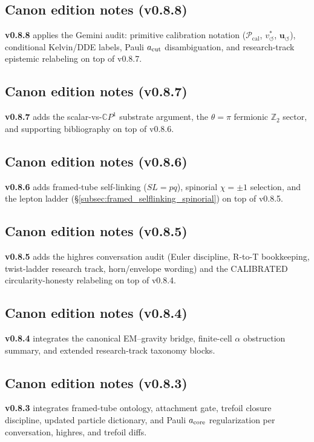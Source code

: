 \documentclass[11pt]{article}
\theoremstyle{definition}
\theoremstyle{plain}
\theoremstyle{remark}
\newcommand{\vchar}{v_{\!\boldsymbol{\circlearrowleft}}^{\ast}}
\newcommand{\uswirl}{\mathbf{u}_{\!\boldsymbol{\circlearrowleft}}}
\begin{document}
        \subsection{Canon edition notes (v0.8.8)}
            \textbf{v0.8.8} applies the Gemini audit: primitive calibration notation ($\mathcal{P}_{\mathrm{cal}}$, $\vchar$, $\uswirl$), conditional Kelvin/DDE labels, Pauli $a_{\rm cut}$ disambiguation, and research-track epistemic relabeling on top of v0.8.7.

        \subsection{Canon edition notes (v0.8.7)}
            \textbf{v0.8.7} adds the scalar-vs-$\mathbb{C}P^1$ substrate argument, the $\theta=\pi$ fermionic $\mathbb{Z}_2$ sector, and supporting bibliography on top of v0.8.6.

        \subsection{Canon edition notes (v0.8.6)}
            \textbf{v0.8.6} adds framed-tube self-linking ($SL=pq$), spinorial $\chi=\pm1$ selection, and the lepton ladder (\S\ref{subsec:framed_selflinking_spinorial}) on top of v0.8.5.

        \subsection{Canon edition notes (v0.8.5)}
            \textbf{v0.8.5} adds the highres conversation audit (Euler discipline, R-to-T bookkeeping, twist-ladder research track, horn/envelope wording) and the CALIBRATED circularity-honesty relabeling on top of v0.8.4.

        \subsection{Canon edition notes (v0.8.4)}
            \textbf{v0.8.4} integrates the canonical EM--gravity bridge, finite-cell $\alpha$ obstruction summary, and extended research-track taxonomy blocks.

        \subsection{Canon edition notes (v0.8.3)}
            \textbf{v0.8.3} integrates framed-tube ontology, attachment gate, trefoil closure discipline, updated particle dictionary, and Pauli $a_{\rm core}$ regularization per conversation, highres, and trefoil diffs.
\end{document}
